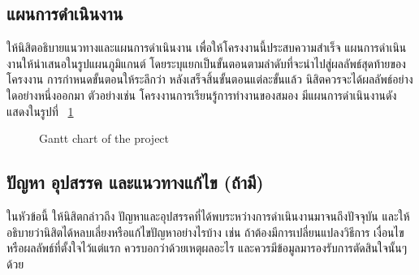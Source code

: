\documentclass[11pt,a4paper]{article}
\begin{document}
\subsection{แผนการดำเนินงาน}
ให้นิสิตอธิบายแนวทางและแผนการดำเนินงาน เพื่อให้โครงงานนี้ประสบความสำเร็จ แผนการดำเนินงานให้นำเสนอในรูปแผนภูมิแกนต์ โดยระบุแยกเป็นขั้นตอนตามลำดับที่จะนำไปสู่ผลลัพธ์สุดท้ายของโครงงาน การกำหนดขั้นตอนให้ระลึกว่า หลังเสร็จสิ้นขั้นตอนแต่ละขั้นแล้ว นิสิตควรจะได้ผลลัพธ์อย่างใดอย่างหนึ่งออกมา ตัวอย่างเช่น โครงงานการเรียนรู้การทำงานของสมอง มีแผนการดำเนินงานดังแสดงในรูปที่ ~\ref{fig:gantt}
\begin{figure}[h]
\noindent{}
\caption{\label{fig:gantt} Gantt chart of the project}
\end{figure}

\subsection{ปัญหา อุปสรรค และแนวทางแก้ไข (ถ้ามี)}
ในหัวข้อนี้ ให้นิสิตกล่าวถึง ปัญหาและอุปสรรคที่ได้พบระหว่างการดำเนินงานมาจนถึงปัจจุบัน และให้อธิบายว่านิสิตได้หลบเลี่ยงหรือแก้ไขปัญหาอย่างไรบ้าง เช่น ถ้าต้องมีการเปลี่ยนแปลงวิธีการ เงื่อนไข หรือผลลัพธ์ที่ตั้งใจไว้แต่แรก ควรบอกว่าด้วยเหตุผลอะไร และควรมีข้อมูลมารองรับการตัดสินใจนั้นๆ ด้วย
\end{document}
